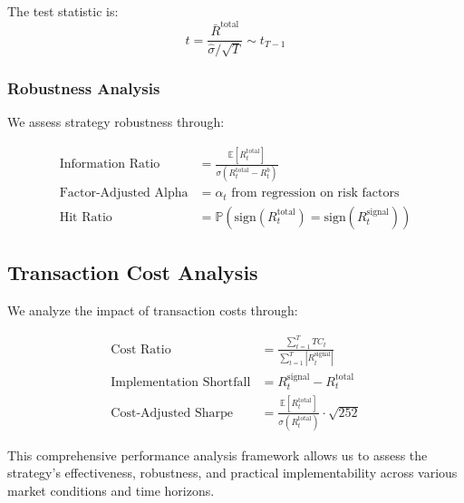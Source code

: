 The test statistic is:
\begin{equation}
    t = \frac{\bar{R}^{\text{total}}}{\hat{\sigma}/\sqrt{T}} \sim t_{T-1}
\end{equation}

\subsubsection{Robustness Analysis}
We assess strategy robustness through:

\begin{equation}
\begin{aligned}
    \text{Information Ratio} &= \frac{\mathbb{E}[R_t^{\text{total}}]}{\sigma(R_t^{\text{total}} - R_t^b)} \\
    \text{Factor-Adjusted Alpha} &= \alpha_t \text{ from regression on risk factors} \\
    \text{Hit Ratio} &= \mathbb{P}(\text{sign}(R_t^{\text{total}}) = \text{sign}(R_t^{\text{signal}}))
\end{aligned}
\end{equation}

\subsection{Transaction Cost Analysis}

We analyze the impact of transaction costs through:

\begin{equation}
\begin{aligned}
    \text{Cost Ratio} &= \frac{\sum_{t=1}^T TC_t}{\sum_{t=1}^T |R_t^{\text{signal}}|} \\
    \text{Implementation Shortfall} &= R_t^{\text{signal}} - R_t^{\text{total}} \\
    \text{Cost-Adjusted Sharpe} &= \frac{\mathbb{E}[R_t^{\text{total}}]}{\sigma(R_t^{\text{total}})} \cdot \sqrt{252}
\end{aligned}
\end{equation}

This comprehensive performance analysis framework allows us to assess the strategy's effectiveness, robustness, and practical implementability across various market conditions and time horizons.
